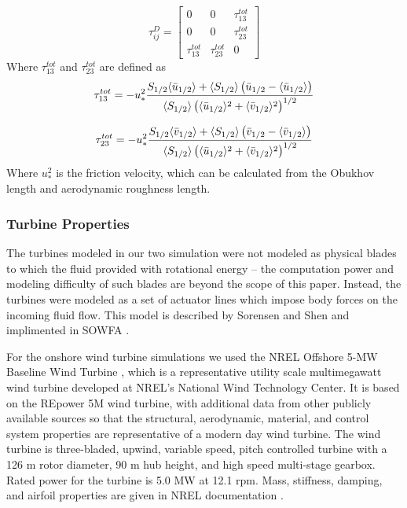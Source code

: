 \begin{equation}
   \label{wall model}
   \tau^D_{ij}=\begin{bmatrix} 0 & 0 & \tau^{tot}_{13} \\ 0 & 0 & \tau^{tot}_{23} \\ \tau^{tot}_{13} & \tau^{tot}_{23} &0 \end{bmatrix}
\end{equation}
Where $\tau^{tot}_{13}$ and $ \tau^{tot}_{23}$ are defined as
\begin{equation}
   \label{tau13}
   \tau^{tot}_{13}=
-u^2_*\frac{S_{1/2}\langle \bar{u}_{1/2}\rangle+\langle S_{1/2}\rangle\left( \bar{u}_{1/2}-\langle\bar{u}_{1/2}\rangle\right) }
{\langle S_{1/2}\rangle\left( \langle\bar{u}_{1/2}\rangle^2+\langle \bar{v}_{1/2}\rangle^2\right)^{1/2} }
\end{equation}

\begin{equation}
   \label{tau23}
   \tau^{tot}_{23}=
   -u^2_*\frac{S_{1/2}\langle \bar{v}_{1/2}\rangle+\langle S_{1/2}\rangle\left( \bar{v}_{1/2}-\langle\bar{v}_{1/2}\rangle\right) }
   {\langle S_{1/2}\rangle\left( \langle\bar{u}_{1/2}\rangle^2+\langle \bar{v}_{1/2}\rangle^2\right)^{1/2} }
\end{equation}
Where $u^2_*$ is the friction velocity, which can be calculated from the Obukhov length and aerodynamic roughness length.

\subsubsection{Turbine Properties}

The turbines modeled in our two simulation were not modeled as physical blades to which the fluid provided with rotational energy -- the computation power and modeling difficulty of such blades are beyond the scope of this paper. Instead, the turbines were modeled as a set of actuator lines which impose body forces on the incoming fluid flow. This model is described by Sorensen and Shen \cite{sorensen:393} and implimented in SOWFA \cite{SOWFA}.

For the onshore wind turbine simulations we used the NREL Offshore 5-MW Baseline Wind Turbine \cite{jonkman_definition_2009}, which is a representative utility scale multimegawatt wind turbine developed at NREL's National Wind Technology Center.  It is based on the REpower 5M wind turbine, with additional data from other publicly available sources so that the structural, aerodynamic, material, and control system properties are representative of a modern day wind turbine.  The wind turbine is three-bladed, upwind, variable speed, pitch controlled turbine with a 126 m rotor diameter, 90 m hub height, and high speed multi-stage gearbox.  Rated power for the turbine is 5.0 MW at 12.1 rpm.  Mass, stiffness, damping, and airfoil properties are given in NREL documentation \cite{jonkman_definition_2009}.


